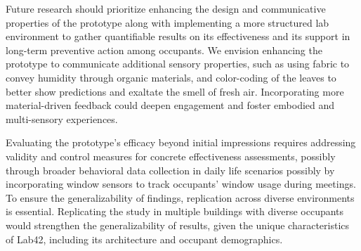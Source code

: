Future research should prioritize enhancing the design and communicative properties of the prototype along with implementing a more structured lab environment to gather quantifiable results on its effectiveness and its support in long-term preventive action among occupants. We envision enhancing the prototype to communicate additional sensory properties, such as using fabric to convey humidity through organic materials, and color-coding of the leaves to better show predictions and exaltate the smell of fresh air. Incorporating more material-driven feedback could deepen engagement and foster embodied and multi-sensory experiences. 

Evaluating the prototype's efficacy beyond initial impressions requires addressing validity and control measures for concrete effectiveness assessments, possibly through broader behavioral data collection in daily life scenarios possibly by incorporating window sensors to track occupants' window usage during meetings. To ensure the generalizability of findings, replication across diverse environments is essential. Replicating the study in multiple buildings with diverse occupants would strengthen the generalizability of results, given the unique characteristics of Lab42, including its architecture and occupant demographics.